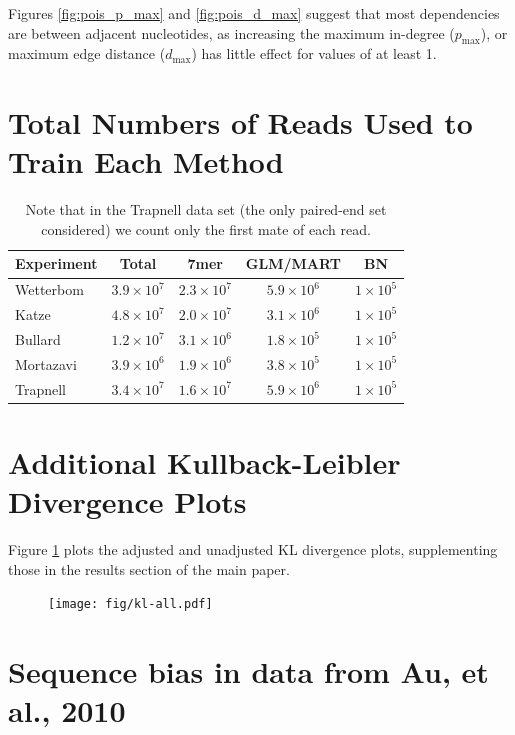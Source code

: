 \documentclass[letterpaper]{article}
\begin{document}
Figures \ref{fig:pois_p_max} and \ref{fig:pois_d_max} suggest that most
dependencies are between adjacent nucleotides, as increasing the maximum
in-degree ($p_{\text{max}}$), or maximum edge distance ($d_{\text{max}}$) has
little effect for values of at least 1.


\section{Total Numbers of Reads Used to Train Each Method}

\begin{table}[H]
\begin{center}
\begin{tabular}{lcccc}
Experiment & Total & 7mer & GLM/MART & BN \\\hline
Wetterbom & $3.9 \times 10^7$ & $2.3 \times 10^7$ & $5.9 \times
10^6$ & $1 \times 10^5$ \\
Katze & $4.8 \times 10^7$ & $2.0 \times 10^7$ & $3.1 \times 10^6$ & $1 \times
10^5$ \\
Bullard & $1.2 \times 10^7$ & $3.1 \times 10^6$ & $1.8 \times 10^5$ & $1 \times
10^5$\\
Mortazavi & $3.9 \times 10^6$ & $1.9 \times 10^6$ & $3.8 \times 10^5$ & $1
\times 10^5$ \\
Trapnell & $3.4 \times 10^7$ & $1.6 \times 10^7$ & $5.9 \times 10^6$ & $1 \times
10^5$
\end{tabular}
\caption{Note that in the Trapnell data set (the only paired-end set considered) we
count only the first mate of each read.}
\label{tab:counts}
\end{center}
\end{table}


\section{Additional Kullback-Leibler Divergence Plots}

Figure \ref{fig:klall} plots the adjusted and unadjusted KL divergence plots,
supplementing those in the results section of the main paper.

\begin{figure}[H]
\centerline{
\texttt{[image: fig/kl-all.pdf]}
}
\caption{}
\label{fig:klall}
\end{figure}


\section{Sequence bias in data from Au, et al., 2010}
\end{document}
